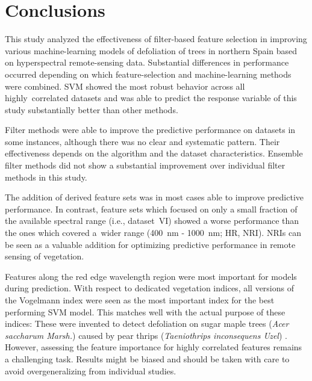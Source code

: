 \documentclass[remotesensing,article,submit,moreauthors,pdftex]{Definitions/mdpi}
\begin{document}
\section{Conclusions}

This study analyzed the effectiveness of filter-based feature selection in improving various machine-learning models of defoliation of trees in northern Spain based on hyperspectral remote-sensing data.
Substantial differences in performance occurred depending on which feature-selection and machine-learning methods were combined.
SVM showed the most robust behavior across all highly\ correlated datasets and was able to predict the response variable of this study substantially better than other methods.

Filter methods were able to improve the predictive performance on datasets in some instances, although there was no clear and systematic pattern.
Their effectiveness depends on the algorithm and the dataset characteristics.
Ensemble filter methods did not show a substantial improvement over individual filter methods in this study.

The addition of derived feature sets was in most cases able to improve predictive performance.
In contrast, feature sets which focused on only a small fraction of the available spectral range (i.e., dataset~VI) showed a worse performance than the ones which covered a\ wider range (400~nm - 1000~nm; HR, NRI).
NRIs can be seen as a valuable addition for optimizing predictive performance in remote sensing of vegetation.

Features along the red edge wavelength region were most important for models during prediction.
With respect to dedicated vegetation indices, all versions of the Vogelmann index were seen as the most important index for the best performing SVM model.
This matches well with the actual purpose of these indices:
These were invented to detect defoliation on sugar maple trees (\textit{Acer saccharum Marsh.}) caused by pear thrips (\textit{Taeniothrips inconsequens Uzel}) \cite{vogelmann1993}.
However, assessing the feature importance for highly correlated features remains a challenging task.
Results might be biased and should be taken with care to avoid overgeneralizing from individual studies.
\end{document}
